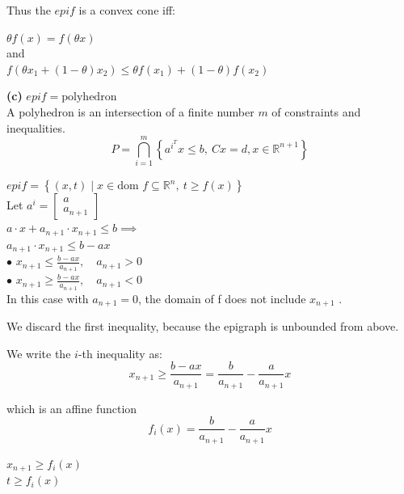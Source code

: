 \documentclass{article}
\begin{document}
\noindent Thus the $epi f$ is a convex cone iff:
\begin{center}
    $\theta f(x) = f(\theta x)$ \\
    and \\
    $f(\theta x_1 + (1-\theta)x_2) \leq \theta f(x_1) + (1-\theta) f(x_2)$
\end{center}




\textbf{(c)}  \noindent $epi f = \text{polyhedron}$ \\

\noindent A polyhedron is an intersection of a finite number $m$ of constraints and inequalities.
\[ P = \bigcap_{i=1}^{m} \left\{ a^{i^T} x \leq b, \ C x = d  ,  x\in \mathbb{R}^{n+1}\right\}  \]

\noindent $epi f = \left\{ (x, t) \mid x \in \text{dom } f \subseteq\mathbb{R}^n  , \ t \geq f(x) \right\}$ \\

\noindent Let $a^{i} = \begin{bmatrix} a \\  a_{n+1} \end{bmatrix}$ \\

\noindent $a \cdot x + a_{n+1} \cdot x_{n+1} \leq b   \implies$ \\

\noindent $a_{n+1} \cdot x_{n+1} \leq b - ax$ \\

\noindent $\bullet$ $x_{n+1} \leq \frac{b - ax}{a_{n+1}}, \quad a_{n+1} > 0$ \\

\noindent $\bullet$ $x_{n+1} \geq \frac{b - ax}{a_{n+1}}, \quad a_{n+1} < 0$ \\

\noindent In this case with $a_{n+1} = 0$, the domain of f does not include $x_{n+1}$ .

\noindent We discard the first inequality, because the epigraph is unbounded from above.

\noindent We write the $i$-th inequality as:
\[ x_{n+1} \geq \frac{b - ax}{a_{n+1}} = \frac{b}{a_{n+1}} - \frac{a}{a_{n+1}} x \]

\noindent which is an affine function
\[ f_i(x) = \frac{b}{a_{n+1}} - \frac{a}{a_{n+1}} x \]

\noindent $x_{n+1} \geq f_i(x)$ \\
$t \geq f_i(x)$ \\
\end{document}
